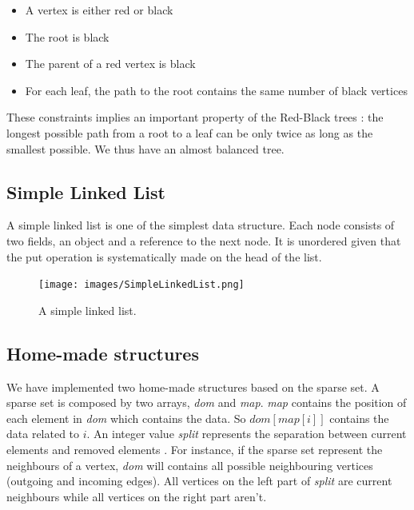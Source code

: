 \begin{itemize}
\item A vertex is either red or black
\item The root is black
\item The parent of a red vertex is black
\item For each leaf, the path to the root contains the same number of black vertices
\end{itemize}

These constraints implies an important property of the Red-Black trees : the longest possible path from a root to a leaf can be only twice as long as the smallest possible. We thus have an almost balanced tree.

\subsection{Simple Linked List}
A simple linked list is one of the simplest data structure. Each node consists of two fields, an object and a reference to the next node. It is unordered given that the put operation is systematically made on the head of the list.

\begin{figure}[!h]
\texttt{[image: images/SimpleLinkedList.png]}
\caption{A simple linked list.}
\end{figure}


\subsection{Home-made structures}
We have implemented two home-made structures based on the sparse set. 
A sparse set is composed by two arrays, \textit{dom} and \textit{map}. \textit{map} contains the position of each element in \textit{dom} which contains the data. So $dom[map[i]]$ contains the data related to $i$. An integer value \textit{split} represents the separation between current elements and removed elements \cite{lectu8}. For instance, if the sparse set represent the neighbours of a vertex, \textit{dom} will contains all possible neighbouring vertices (outgoing and incoming edges). All vertices on the left part of \textit{split} are current neighbours while all vertices on the right part aren't. \newline

